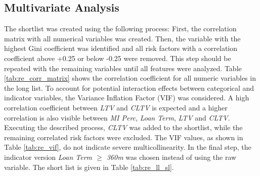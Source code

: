 \newpage
\subsection{Multivariate Analysis}

The shortlist was created using the following process: First, the correlation matrix with all numerical variables was created. Then, the variable with the highest Gini coefficient was identified and all risk factors with a correlation coefficient above +0.25 or below -0.25 were removed. This step should be repeated with the remaining variables until all features were analyzed. 
Table \ref{tab:re_corr_matrix} shows the correlation coefficient for all numeric variables in the long list. To account for potential interaction effects between categorical and indicator variables, the Variance Inflation Factor (VIF) was considered. A high correlation coefficient between \emph{LTV} and \emph{CLTV} is expected and a higher correlation is also visible between \emph{MI Perc}, \emph{Loan Term}, \emph{LTV} and \emph{CLTV}. Executing the described process, \emph{CLTV} was added to the shortlist, while the remaining correlated risk factors were excluded.  The VIF values, as shown in Table \ref{tab:re_vif}, do not indicate severe multicollinearity. In the final step, the indicator version \emph{Loan Term $\geq$ 360m} was chosen instead of using the raw variable. The short list is given in Table \ref{tab:re_ll_sl}.

